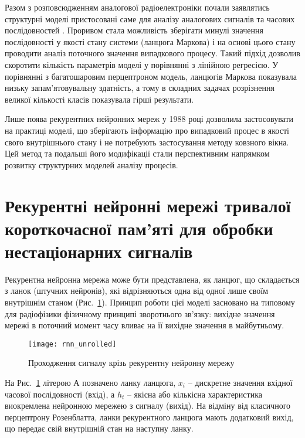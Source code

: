 Разом з розповсюдженням аналогової радіоелектроніки почали заявлятись 
структурні моделі пристосовані саме для аналізу аналогових сигналів 
та часових послідовностей \cite{imp:Markov1906}. Проривом стала можливість
зберігати минулі значення послідовності у якості стану системи 
(ланцюга Маркова) і на основі цього стану проводити аналіз поточного 
значення випадкового процесу. Такий підхід дозволив скоротити кількість 
параметрів моделі у порівнянні з лінійною регресією. У порівнянні з 
багатошаровим перцептроном модель, ланцюгів Маркова показувала низьку 
запам'ятовувальну здатність, а тому в складних задачах розрізнення великої 
кількості класів показувала гірші результати.

Лише поява рекурентних нейронних мереж у 1988 році \cite{imp:Rumelhart1988} 
дозволила застосовувати на практиці моделі, що зберігають інформацію про 
випадковий процес в якості свого внутрішнього стану і не потребують 
застосування методу ковзного вікна. Цей метод та подальші його модифікації
стали перспективним напрямком розвитку структурних моделей аналізу процесів. 


\section{Рекурентні нейронні мережі тривалої короткочасної пам'яті для 
обробки нестаціонарних сигналів}

Рекурентна нейронна мережа може бути представлена, як ланцюг, що складається
з ланок (штучних нейронів), які відрізняються одна від одної лише своїм 
внутрішнім станом (Рис.~\ref{fig:rnn_unrolled}). Принцип роботи цієї моделі 
засновано на типовому для радіофізики фізичному принципі зворотнього зв'язку:
вихідне значення мережі в поточний момент часу вливає на її вихідне значення 
в майбутньому.

\begin{figure}[htbp] \begin{center}
\texttt{[image: rnn\_unrolled]}
\caption{Проходження сигналу крізь рекурентну нейронну мережу}
\label{fig:rnn_unrolled}
\end{center} \end{figure}

На Рис.~\ref{fig:rnn_unrolled} літерою А позначено ланку ланцюга, $ x_i $ --
дискретне значення вхідної часової послідовності (вхід), а $ h_t $ -- якісна 
або кількісна характеристика виокремлена нейронною мережею з сигналу (вихід). 
На відміну від класичного перцептрону Розенблатта, ланки рекурентного ланцюга 
мають додатковий вихід, що передає свій внутрішній стан на наступну ланку.

